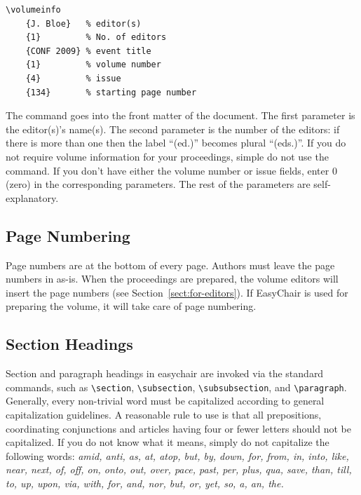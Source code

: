 \documentclass[]{easychair}
\newcommand{\easychair}{\textsf{easychair}}
\begin{document}
\begin{verbatim}
\volumeinfo
    {J. Bloe}   % editor(s)
    {1}         % No. of editors
    {CONF 2009} % event title
    {1}         % volume number
    {4}         % issue
    {134}       % starting page number
\end{verbatim}

\noindent
The command goes into the front matter of the document. The first
parameter is the editor(s)'s name(s).  The second parameter is the
number of the editors: if there is more than one then the label
``(ed.)'' becomes plural ``(eds.)''.  If you do not require volume
information for your proceedings, simple do not use the command.  If
you don't have either the volume number or issue fields, enter $0$
(zero) in the corresponding parameters.  The rest of the parameters
are self-explanatory.

\subsection{Page Numbering}
\label{sect:page-numbering}

Page numbers are at the bottom of every page. Authors must leave the
page numbers in as-is. When the proceedings are prepared, the volume
editors will insert the page numbers (see
Section~\ref{sect:for-editors}). If EasyChair is used for preparing
the volume, it will take care of page numbering.

\subsection{Section Headings}
\label{sect:section-headings}

Section and paragraph headings in {\easychair} are invoked via the standard 
commands, such as
\verb+\section+,
\verb+\subsection+,
\verb+\subsubsection+, and
\verb+\paragraph+.
Generally, every non-trivial word must be capitalized according to
general capitalization guidelines. A reasonable rule to use is that
all prepositions, coordinating conjunctions and articles having four
or fewer letters should not be capitalized. If you do not know what it
means, simply do not capitalize the following words:
\textit{amid, anti, as, at, atop, but, by, down, for, from, in, into, like,
near, next, of, off, on, onto, out, over, pace, past, per, plus, qua,
save, than, till, to, up, upon, via, with, for, and, nor, but, or,
yet, so, a, an, the.}
\end{document}
